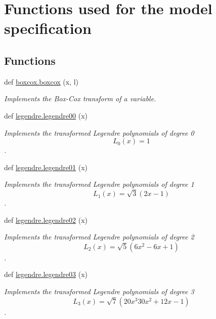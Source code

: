 \hypertarget{group__specs}{}\section{Functions used for the model specification}
\label{group__specs}
\subsection*{Functions}
\begin{DoxyCompactItemize}
\item 
def \hyperlink{group__specs_ga37dd0ede277e0a43d481e98dd0a0425c}{boxcox.\+boxcox} (x, l)
\begin{DoxyCompactList}\small\item\em Implements the Box-\/\+Cox transform of a variable. \end{DoxyCompactList}\item 
def \hyperlink{group__specs_ga72f9b022b13efc9574ee7ff66807ab3f}{legendre.\+legendre00} (x)
\begin{DoxyCompactList}\small\item\em Implements the transformed Legendre polynomials of degree 0 \[ L_0(x) = 1 \]. \end{DoxyCompactList}\item 
def \hyperlink{group__specs_ga69a636d32013df93957fd5a066efa7b1}{legendre.\+legendre01} (x)
\begin{DoxyCompactList}\small\item\em Implements the transformed Legendre polynomials of degree 1 \[ L_1(x)=\sqrt{3}(2x-1) \]. \end{DoxyCompactList}\item 
def \hyperlink{group__specs_gae71b5378aaa79e4f1fd3b3307db2ee85}{legendre.\+legendre02} (x)
\begin{DoxyCompactList}\small\item\em Implements the transformed Legendre polynomials of degree 2 \[ L_2(x)=\sqrt{5}(6x^2-6x+1) \]. \end{DoxyCompactList}\item 
def \hyperlink{group__specs_ga1c7bdf7645fb3080cd34617e88770914}{legendre.\+legendre03} (x)
\begin{DoxyCompactList}\small\item\em Implements the transformed Legendre polynomials of degree 3 \[ L_3(x)=\sqrt{7}(20 x^3 30 x^2+12x-1) \]. \end{DoxyCompactList}\item 

\end{DoxyCompactItemize}
